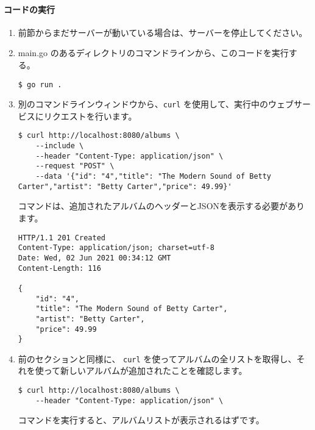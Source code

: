 \paragraph{コードの実行}

\begin{enumerate}
\item
  前節からまだサーバーが動いている場合は、サーバーを停止してください。
\item
  main.go のあるディレクトリのコマンドラインから、このコードを実行する。





\begin{lstlisting}[numbers=none]
 $ go run .
\end{lstlisting}
\item
  別のコマンドラインウィンドウから、\texttt{curl}
  を使用して、実行中のウェブサービスにリクエストを行います。

\begin{lstlisting}[numbers=none]
$ curl http://localhost:8080/albums \
    --include \
    --header "Content-Type: application/json" \
    --request "POST" \
    --data '{"id": "4","title": "The Modern Sound of Betty Carter","artist": "Betty Carter","price": 49.99}'
\end{lstlisting}

  コマンドは、追加されたアルバムのヘッダーとJSONを表示する必要があります。

\begin{lstlisting}[numbers=none]
HTTP/1.1 201 Created
Content-Type: application/json; charset=utf-8
Date: Wed, 02 Jun 2021 00:34:12 GMT
Content-Length: 116

{
    "id": "4",
    "title": "The Modern Sound of Betty Carter",
    "artist": "Betty Carter",
    "price": 49.99
}
\end{lstlisting}
\item
  前のセクションと同様に、 \texttt{curl}
  を使ってアルバムの全リストを取得し、それを使って新しいアルバムが追加されたことを確認します。

\begin{lstlisting}[numbers=none]
$ curl http://localhost:8080/albums \
    --header "Content-Type: application/json" \
\end{lstlisting}

  コマンドを実行すると、アルバムリストが表示されるはずです。


\end{enumerate}
